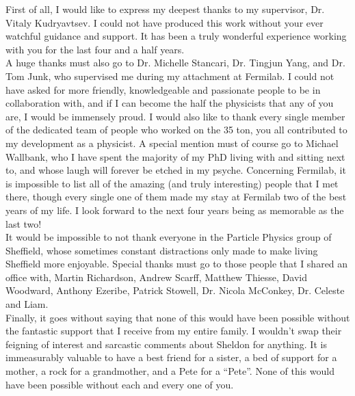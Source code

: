 
\begin{acknowledgements}      

  First of all, I would like to express my deepest thanks to my supervisor, Dr. Vitaly Kudryavtsev. I could not have produced this work without your ever watchful guidance and support. It has been a truly wonderful experience working with you for the last four and a half years. \\
  
  A huge thanks must also go to Dr. Michelle Stancari, Dr. Tingjun Yang, and Dr. Tom Junk, who supervised me during my attachment at Fermilab. I could not have asked for more friendly, knowledgeable and passionate people to be in collaboration with, and if I can become the half the physicists that any of you are, I would be immensely proud. I would also like to thank every single member of the dedicated team of people who worked on the 35 ton, you all contributed to my development as a physicist. A special mention must of course go to Michael Wallbank, who I have spent the majority of my PhD living with and sitting next to, and whose laugh will forever be etched in my psyche. Concerning Fermilab, it is impossible to list all of the amazing (and truly interesting) people that I met there, though every single one of them made my stay at Fermilab two of the best years of my life. I look forward to the next four years being as memorable as the last two! \\

  It would be impossible to not thank everyone in the Particle Physics group of Sheffield, whose sometimes constant distractions only made to make living Sheffield more enjoyable. Special thanks must go to those people that I shared an office with, Martin Richardson, Andrew Scarff, Matthew Thiesse, David Woodward, Anthony Ezeribe, Patrick Stowell, Dr. Nicola McConkey, Dr. Celeste and Liam. \\

  Finally, it goes without saying that none of this would have been possible without the fantastic support that I receive from my entire family. I wouldn't swap their feigning of interest and sarcastic comments about Sheldon for anything. It is immeasurably valuable to have a best friend for a sister, a bed of support for a mother, a rock for a grandmother, and a Pete for a ``Pete''. None of this would have been possible without each and every one of you. \\

\end{acknowledgements}
